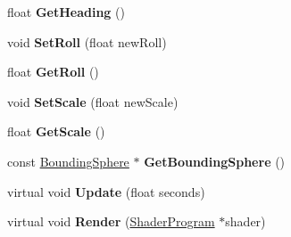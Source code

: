 \begin{DoxyCompactItemize}
\item 
\hypertarget{class_space_object_a5f48d0fa65b7eda19f2a983493080863}{float {\bfseries Get\-Heading} ()}\label{class_space_object_a5f48d0fa65b7eda19f2a983493080863}

\item 
\hypertarget{class_space_object_abb5b349ab7fedf495206aca656ed8ca8}{void {\bfseries Set\-Roll} (float new\-Roll)}\label{class_space_object_abb5b349ab7fedf495206aca656ed8ca8}

\item 
\hypertarget{class_space_object_a5bc28e1ac20023f74fd08e5da92f9442}{float {\bfseries Get\-Roll} ()}\label{class_space_object_a5bc28e1ac20023f74fd08e5da92f9442}

\item 
\hypertarget{class_space_object_a078b5a8391776b46f7ee8fb42499d913}{void {\bfseries Set\-Scale} (float new\-Scale)}\label{class_space_object_a078b5a8391776b46f7ee8fb42499d913}

\item 
\hypertarget{class_space_object_a1f985fa1a6cdbe35b01fbbada8b5393e}{float {\bfseries Get\-Scale} ()}\label{class_space_object_a1f985fa1a6cdbe35b01fbbada8b5393e}

\item 
\hypertarget{class_space_object_aeb45d06a3ba3f6dea1835d9056a694a9}{const \hyperlink{struct_bounding_sphere}{Bounding\-Sphere} $\ast$ {\bfseries Get\-Bounding\-Sphere} ()}\label{class_space_object_aeb45d06a3ba3f6dea1835d9056a694a9}

\item 
\hypertarget{class_space_object_a5c027a510d9bec3b963fb24485f52a9f}{virtual void {\bfseries Update} (float seconds)}\label{class_space_object_a5c027a510d9bec3b963fb24485f52a9f}

\item 
\hypertarget{class_space_object_a60fcb91c19b5f389b7fca7072f7228b7}{virtual void {\bfseries Render} (\hyperlink{class_shader_program}{Shader\-Program} $\ast$shader)}\label{class_space_object_a60fcb91c19b5f389b7fca7072f7228b7}

\end{DoxyCompactItemize}
